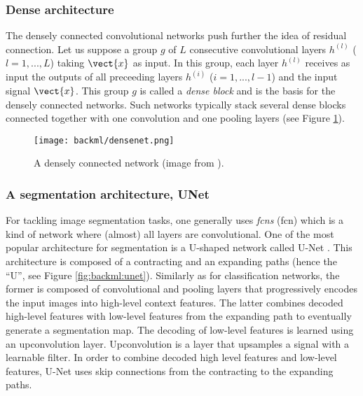 \subsubsection{Dense architecture}
\label{sssec:backml:arch:dense}
The densely connected convolutional networks \parencite{huang2017densely} push
further the idea of residual connection. Let us suppose a group $g$ of $L$
consecutive convolutional layers $h^{(l)}$ ($l = 1, ..., L$) taking $\vect{x}$ as
input. In this group, each layer $h^{(l)}$ receives as input the outputs of all
preceeding layers $h^{(i)}$ ($i = 1, ..., l-1$) and the input signal $\vect{x}$.
This group $g$ is called a \textit{dense block} and is the basis for the densely
connected networks. Such networks typically stack several dense blocks connected
together with one convolution and one pooling layers (see Figure
\ref{fig:backml:densenet}).

\begin{figure}
  \centering
  \texttt{[image: backml/densenet.png]}
  \caption{A densely connected network (image from \parencite{huang2017densely}).}
  \label{fig:backml:densenet}
\end{figure}

\subsubsection{A segmentation architecture, UNet}
\label{sssec:backml:arch:segment}

For tackling image segmentation tasks, one generally uses \textit{\acrlong{fcn}s}
(\acrshort{fcn}) which is a kind of network where (almost) all layers are
convolutional. One of the most popular architecture for segmentation is a U-shaped
network called U-Net \parencite{ronneberger2015unet}. This architecture is composed
of a contracting and an expanding paths (hence the ``U'', see Figure
\ref{fig:backml:unet}). Similarly as for classification networks, the former is
composed of convolutional and pooling layers that progressively encodes the input
images into high-level context features. The latter combines decoded high-level
features with low-level features from the expanding path to eventually generate
a segmentation map. The decoding of low-level features is learned using an
upconvolution layer. Upconvolution is a layer that upsamples a signal with a
learnable filter. In order to combine decoded high level features and low-level
features, U-Net uses skip connections from the contracting to the expanding
paths.

